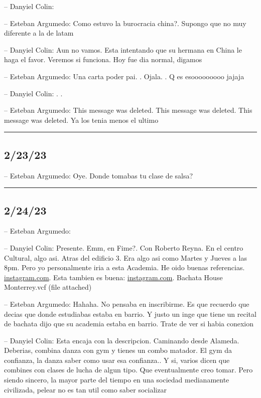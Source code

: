 -- Danyiel Colin:

-- Esteban Argumedo: Como estuvo la burocracia china?. Supongo que no
muy diferente a la de latam

-- Danyiel Colin: Aun no vamos. Esta intentando que su hermana en China
le haga el favor. Veremos si funciona. Hoy fue dia normal, digamos

-- Esteban Argumedo: Una carta poder pai. . Ojala. . Q es esooooooooo
jajaja

-- Danyiel Colin: . .

-- Esteban Argumedo: This message was deleted. This message was deleted.
This message was deleted. Ya los tenia menos el ultimo

\begin{center}\rule{0.5\linewidth}{0.5pt}\end{center}

\hypertarget{section-187}{%
\subsection{2/23/23}\label{section-187}}

-- Esteban Argumedo: Oye. Donde tomabas tu clase de salsa?

\begin{center}\rule{0.5\linewidth}{0.5pt}\end{center}

\hypertarget{section-188}{%
\subsection{2/24/23}\label{section-188}}

-- Esteban Argumedo:

-- Danyiel Colin: Presente. Emm, en Fime?. Con Roberto Reyna. En el
centro Cultural, algo asi. Atras del edificio 3. Era algo asi como
Martes y Jueves a las 8pm. Pero yo personalmente iria a esta Academia.
He oido buenas referencias.
\href{https://instagram.com/bachatahousemonterrey?igshid=YmMyMTA2M2Y=}{instagram.com}.
Esta tambien es buena:
\href{https://instagram.com/mty.salsa.academy?igshid=YmMyMTA2M2Y=}{instagram.com}.
Bachata House Monterrey.vcf (file attached)

-- Esteban Argumedo: Hahaha. No pensaba en inscribirme. Es que recuerdo
que decias que donde estudiabas estaba en barrio. Y justo un inge que
tiene un recital de bachata dijo que su academia estaba en barrio. Trate
de ver si habia conexion

-- Danyiel Colin: Esta encaja con la descripcion. Caminando desde
Alameda. Deberias, combina danza con gym y tienes un combo matador. El
gym da confianza, la danza saber como usar esa confianza.. Y si, varios
dicen que combines con clases de lucha de algun tipo. Que eventualmente
creo tomar. Pero siendo sincero, la mayor parte del tiempo en una
sociedad medianamente civilizada, pelear no es tan util como saber
socializar

